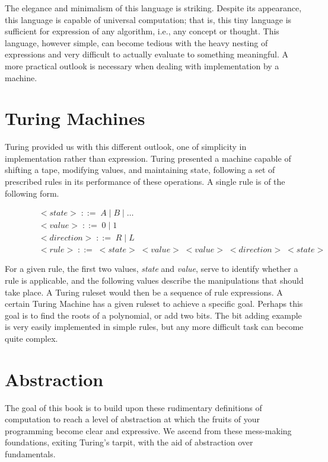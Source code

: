 The elegance and minimalism of this language is striking. Despite its appearance, 
this language is capable of universal computation; that is, this tiny language is 
sufficient for expression of any algorithm, i.e., any concept or thought. This 
language, however simple, can become tedious with the heavy nesting of expressions 
and very difficult to actually evaluate to something meaningful. A more practical 
outlook is necessary when dealing with implementation by a machine.

\section{Turing Machines}
Turing provided us with this different outlook, one of simplicity in 
implementation rather than expression. Turing presented a machine capable of 
shifting a tape, modifying values, and maintaining state, following a set of 
prescribed rules in its performance of these operations. A single rule is of the 
following form.

\begin{figure}[htp]
\caption{}\label{}
\begin{align*}
& <state> \; ::= \; A \; | \; B \; | \; \dots
\\& <value> \; ::= \; 0 \; | \; 1
\\& <direction> \; ::= \; R \; | \; L
\\& <rule> \; ::= \; <state> \; <value> \; <value> \; <direction> \; <state>
\end{align*}
\end{figure}

For a given rule, the first two values, \emph{state} and \emph{value}, serve to identify 
whether a rule is applicable, and the following values describe the manipulations 
that should take place. A Turing ruleset would then be a sequence of rule 
expressions. A certain Turing Machine has a given ruleset to achieve a specific 
goal. Perhaps this goal is to find the roots of a polynomial, or add two bits. The 
bit adding example is very easily implemented in simple rules, but any more 
difficult task can become quite complex.

\section{Abstraction}
The goal of this book is to build upon these rudimentary definitions of 
computation to reach a level of abstraction at which the fruits of your 
programming become clear and expressive. We ascend from these mess-making 
foundations, exiting Turing's tarpit, with the aid of abstraction over 
fundamentals.

